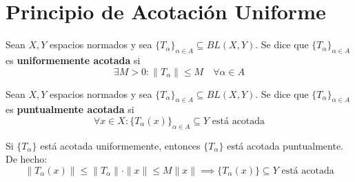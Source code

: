 \chapter{Principio de Acotación Uniforme}

\begin{definicion}
    Sean $X, Y$ espacios normados y sea $\{T_\alpha\}_{\alpha \in A} \subseteq BL(X, Y)$. Se dice que $\{T_\alpha\}_{\alpha \in A}$ es \textbf{uniformemente acotada} si
    \begin{equation*}
        \exists M > 0 : \|T_\alpha\| \leq M \quad \forall \alpha \in A
    \end{equation*}
\end{definicion}

\begin{definicion}
    Sean $X, Y$ espacios normados y sea $\{T_\alpha\}_{\alpha \in A} \subseteq BL(X, Y)$. Se dice que $\{T_\alpha\}_{\alpha \in A}$ es \textbf{puntualmente acotada} si
    \begin{equation*}
        \forall x \in X : \{T_\alpha(x)\}_{\alpha \in A} \subseteq Y \text{ está acotada}
    \end{equation*}
\end{definicion}

\begin{observacion}
    Si $\{T_\alpha\}$ está acotada uniformemente, entonces $\{T_\alpha\}$ está acotada puntualmente. De hecho:
    \begin{equation*}
        \|T_\alpha(x)\| \leq \|T_\alpha\| \cdot \|x\| \leq M \|x\| \implies \{T_\alpha(x)\} \subseteq Y \text{ está acotada}
    \end{equation*}
\end{observacion}



